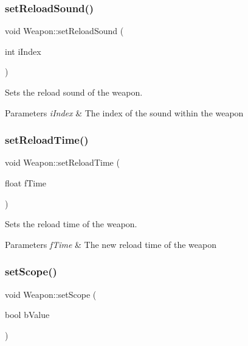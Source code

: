 \subsubsection{\texorpdfstring{set\+Reload\+Sound()}{setReloadSound()}}
{\footnotesize\ttfamily void Weapon\+::set\+Reload\+Sound (\begin{DoxyParamCaption}\item[{int}]{i\+Index }\end{DoxyParamCaption})}



Sets the reload sound of the weapon. 


\begin{DoxyParams}{Parameters}
{\em i\+Index} & The index of the sound within the weapon \\
\hline
\end{DoxyParams}
\mbox{\label{class_weapon_a29ed8c4bd8eab68e07b5fd3aeadc3261}} 
\subsubsection{\texorpdfstring{set\+Reload\+Time()}{setReloadTime()}}
{\footnotesize\ttfamily void Weapon\+::set\+Reload\+Time (\begin{DoxyParamCaption}\item[{float}]{f\+Time }\end{DoxyParamCaption})}



Sets the reload time of the weapon. 


\begin{DoxyParams}{Parameters}
{\em f\+Time} & The new reload time of the weapon \\
\hline
\end{DoxyParams}
\mbox{\label{class_weapon_a106be3929394c3641cb5f4a023e03862}} 
\subsubsection{\texorpdfstring{set\+Scope()}{setScope()}}
{\footnotesize\ttfamily void Weapon\+::set\+Scope (\begin{DoxyParamCaption}\item[{bool}]{b\+Value }\end{DoxyParamCaption})}



